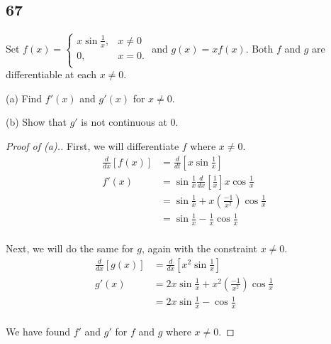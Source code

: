 \documentclass[../hw3.tex]{subfiles}
\begin{document}
\subsection*{67}
Set $f(x) = \begin{cases}
    x\sin{\frac{1}{x}}, & x \neq 0 \\
    0, & x = 0. \\
\end{cases}$ and $g(x) = xf(x)$. Both $f$ and $g$ are differentiable at each $x \neq 0$.

(a) Find $f'(x)$ and $g'(x)$ for $x \neq 0$.

(b) Show that $g'$ is not continuous at 0.

\begin{proof}[Proof of (a).] 
    
    First, we will differentiate $f$ where $x \neq 0$.
    \begin{align*}
        \frac{d}{dx} \left[ f(x) \right] &= \frac{d}{dt} \left[ x\sin{\frac{1}{x}} \right] \\
        f'(x) &= \sin{\frac{1}{x}} \frac{d}{dx} \left[ \frac{1}{x} \right] x\cos{\frac{1}{x}} \\
        &= \sin{\frac{1}{x}} + x \left( \frac{-1}{x^2} \right)\cos{\frac{1}{x}} \\
        &= \sin{\frac{1}{x}} - \frac{1}{x}\cos{\frac{1}{x}} \\
    \end{align*}

    Next, we will do the same for $g$, again with the constraint $x \neq 0$.
    \begin{align*}
        \frac{d}{dx} \left[ g(x) \right] &= \frac{d}{dx} \left[ x^2\sin{\frac{1}{x}} \right] \\
        g'(x) &= 2x\sin{\frac{1}{x}} + x^2 \left( \frac{-1}{x^2} \right) \cos{\frac{1}{x}} \\
        &= 2x\sin{\frac{1}{x}} - \cos{\frac{1}{x}} \\
    \end{align*}

    We have found $f'$ and $g'$ for $f$ and $g$ where $x \neq 0$.
\end{proof}
\end{document}
